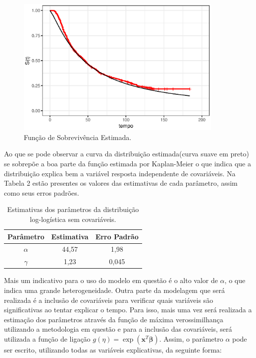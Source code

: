 \documentclass[a4paper,12pt]{article}
\begin{document}
\begin{figure}[H] \label{fig:surv_vit}
  \begin{center}
    \includegraphics[width=10cm]{mod_vazio_vit}
    \caption{Função de Sobrevivência Estimada.}
  \end{center}
\end{figure}

Ao que se pode observar a curva da distribuição estimada(curva suave em preto) se sobrepõe a boa parte da função estimada por Kaplan-Meier o que indica que a distribuição explica bem a variável resposta independente de covariáveis. Na Tabela 2 estão presentes os valores das estimativas de cada parâmetro, assim como seus erros padrões.

\begin{table}[H]
\centering
\caption{Estimativas dos parâmetros da distribuição log-logística sem covariáveis.}
\begin{tabular}{c|cc}
\hline
Parâmetro & Estimativa & Erro Padrão \\
\hline
$\alpha$ & 44,57 & 1,98  \\

$\gamma$ & 1,23 & 0,045 \\
\hline
\end{tabular}
\end{table}

Mais um indicativo para o uso do modelo em questão é o alto valor de $\alpha$, o que indica uma grande heterogeneidade. Outra parte da modelagem que será realizada é a inclusão de covariáveis para verificar quais variáveis são significativas ao tentar explicar o tempo. Para isso, mais uma vez será realizada a estimação dos parâmetros através da função de máxima verossimilhança utilizando a metodologia em questão e para a inclusão das covariáveis, será utilizada a função de ligação $g(\eta) = \exp(\boldsymbol{x}^T\boldsymbol{\beta})$. Assim, o parâmetro $\alpha$ pode ser escrito, utilizando todas as variáveis explicativas, da seguinte forma:
\end{document}
